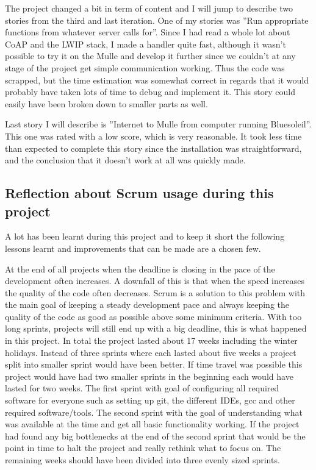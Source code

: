 The project changed a bit in term of content and I will jump to describe two stories from the third and last iteration.
One of my stories was ''Run appropriate functions from whatever server calls for''. Since I had read a whole lot about CoAP and 
the LWIP stack, I made a handler quite fast, although it wasn't possible to try it on the Mulle and develop it further since
we couldn't at any stage of the project get simple communication working. Thus the code was scrapped, but the time estimation was somewhat
correct in regards that it would probably have taken lots of time to debug and implement it. 
This story could easily have been broken down to smaller parts as well.

Last story I will describe is ''Internet to Mulle from computer running Bluesoleil''. This one was rated with a low score, which is 
very reasonable. It took less time than expected to complete this story since the installation was straightforward, and the conclusion
that it doesn't work at all was quickly made.

\subsection{Reflection about Scrum usage during this project}
A lot has been learnt during this project and to keep it short the following lessons learnt and improvements that can be made are a chosen few.

At the end of all projects when the deadline is closing in the pace of the development often increases.
A downfall of this is that when the speed increases the quality of the code often decreases.
Scrum is a solution to this problem with the main goal of keeping a steady development pace and always keeping the quality of the code as good as possible above some minimum criteria.
With too long sprints, projects will still end up with a big deadline, this is what happened in this project.
In total the project lasted about 17 weeks including the winter holidays.
Instead of three sprints where each lasted about five weeks a project split into smaller sprint would have been better.
If time travel was possible this project would have had two smaller sprints in the beginning each would have lasted for two weeks.
The first sprint with goal of configuring all required software for everyone such as setting up git, the different IDEs, gcc and other required software/tools.
The second sprint with the goal of understanding what was available at the time and get all basic functionality working.
If the project had found any big bottlenecks at the end of the second sprint that would be the point in time to halt the project and really rethink what to focus on.
The remaining weeks should have been divided into three evenly sized sprints.

